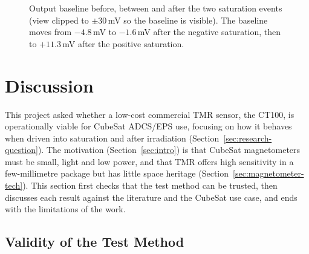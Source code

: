 \documentclass[12pt,a4paper]{article}
\begin{document}
\begin{figure}[H]
\centering
{}
\caption{Output baseline before, between and after the two saturation events (view clipped to $\pm30$\,mV so the baseline is visible). The baseline moves from $-4.8$\,mV to $-1.6$\,mV after the negative saturation, then to $+11.3$\,mV after the positive saturation.}
\label{fig:mh-baseline}
\end{figure}
 
 

\section{Discussion}
\label{sec:discussion}

This project asked whether a low-cost commercial TMR sensor, the CT100, is operationally viable for CubeSat ADCS/EPS use, focusing on how it behaves when driven into saturation and after irradiation (Section~\ref{sec:research-question}). The motivation (Section~\ref{sec:intro}) is that CubeSat magnetometers must be small, light and low power, and that TMR offers high sensitivity in a few-millimetre package but has little space heritage (Section~\ref{sec:magnetometer-tech}). This section first checks that the test method can be trusted, then discusses each result against the literature and the CubeSat use case, and ends with the limitations of the work.

\subsection{Validity of the Test Method}
\label{sec:disc-validity}
\end{document}
